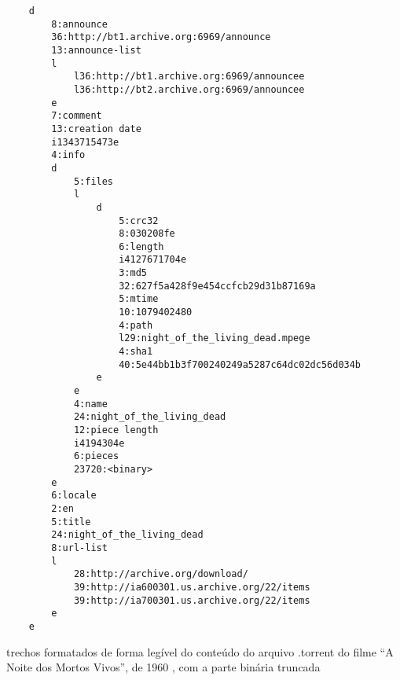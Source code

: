 \begin{listing}[H]
    \begin{verbatim}
    d
        8:announce
        36:http://bt1.archive.org:6969/announce
        13:announce-list
        l
            l36:http://bt1.archive.org:6969/announcee
            l36:http://bt2.archive.org:6969/announcee
        e
        7:comment
        13:creation date
        i1343715473e
        4:info
        d
            5:files
            l
                d
                    5:crc32
                    8:030208fe
                    6:length
                    i4127671704e
                    3:md5
                    32:627f5a428f9e454ccfcb29d31b87169a
                    5:mtime
                    10:1079402480
                    4:path
                    l29:night_of_the_living_dead.mpege
                    4:sha1
                    40:5e44bb1b3f700240249a5287c64dc02dc56d034b
                e
            e
            4:name
            24:night_of_the_living_dead
            12:piece length
            i4194304e
            6:pieces
            23720:<binary>
        e
        6:locale
        2:en
        5:title
        24:night_of_the_living_dead
        8:url-list
        l
            28:http://archive.org/download/
            39:http://ia600301.us.archive.org/22/items
            39:http://ia700301.us.archive.org/22/items
        e
    e
    \end{verbatim}
    \caption{trechos formatados de forma legível do conteúdo do arquivo .torrent do
    filme \enquote{A Noite dos Mortos Vivos}, de 1960 \cite{torrent-file}, com a parte
    binária truncada}
    \label{lst:torrent-file-code}
\end{listing}